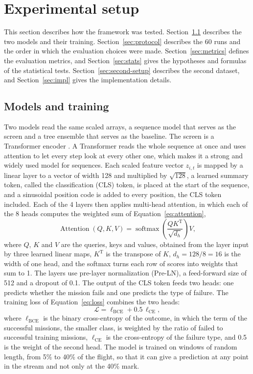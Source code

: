 \section{Experimental setup}
\label{sec:setup}

This section describes how the framework was tested. Section~\ref{sec:models} describes the two models and their training. Section~\ref{sec:protocol} describes the 60 runs and the order in which the evaluation choices were made. Section~\ref{sec:metrics} defines the evaluation metrics, and Section~\ref{sec:stats} gives the hypotheses and formulas of the statistical tests. Section~\ref{sec:second-setup} describes the second dataset, and Section~\ref{sec:impl} gives the implementation details.

\subsection{Models and training}
\label{sec:models}

Two models read the same scaled arrays, a sequence model that serves as the screen and a tree ensemble that serves as the baseline. The screen is a Transformer encoder \cite{vaswani2017}. A Transformer reads the whole sequence at once and uses attention to let every step look at every other one, which makes it a strong and widely used model for sequences. Each scaled feature vector $z_{i,t}$ is mapped by a linear layer to a vector of width 128 and multiplied by $\sqrt{128}$, a learned summary token, called the classification (CLS) token, is placed at the start of the sequence, and a sinusoidal position code is added to every position, the CLS token included. Each of the 4 layers then applies multi-head attention, in which each of the 8 heads computes the weighted sum of Equation~\ref{eq:attention},
\begin{equation}
\operatorname{Attention}(Q, K, V) = \operatorname{softmax} \left( \frac{Q K^{\mathrm{T}}}{\sqrt{d_h}} \right) V,
\label{eq:attention}
\end{equation}
where $Q$, $K$ and $V$ are the queries, keys and values, obtained from the layer input by three learned linear maps, $K^{\mathrm{T}}$ is the transpose of $K$, $d_h = 128 / 8 = 16$ is the width of one head, and the softmax turns each row of scores into weights that sum to 1. The layers use pre-layer normalization (Pre-LN), a feed-forward size of 512 and a dropout of 0.1. The output of the CLS token feeds two heads: one predicts whether the mission fails and one predicts the type of failure. The training loss of Equation~\ref{eq:loss} combines the two heads:
\begin{equation}
\mathcal{L} = \ell_{\mathrm{BCE}} + 0.5 \, \ell_{\mathrm{CE}},
\label{eq:loss}
\end{equation}
where $\ell_{\mathrm{BCE}}$ is the binary cross-entropy of the outcome, in which the term of the successful missions, the smaller class, is weighted by the ratio of failed to successful training missions, $\ell_{\mathrm{CE}}$ is the cross-entropy of the failure type, and 0.5 is the weight of the second head. The model is trained on windows of random length, from 5\% to 40\% of the flight, so that it can give a prediction at any point in the stream and not only at the 40\% mark.

